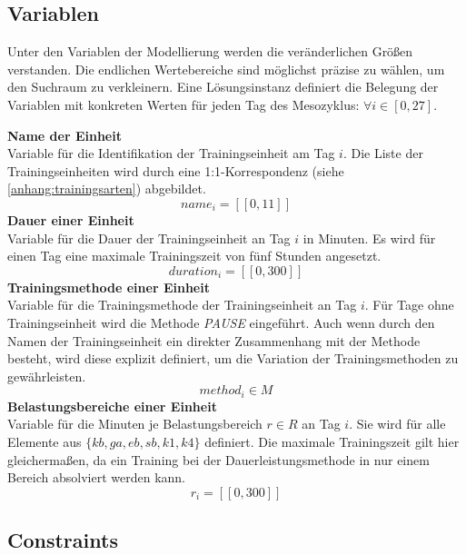 \subsection{Variablen}
Unter den Variablen der Modellierung werden die veränderlichen Größen verstanden. Die endlichen Wertebereiche sind möglichst präzise zu wählen, um den Suchraum zu verkleinern. Eine Lösungsinstanz definiert die Belegung der Variablen mit konkreten Werten für jeden Tag des Mesozyklus:  $\forall i \in [0, 27]$.\par
\textbf{Name der Einheit} \\[0.2em]
Variable für die Identifikation der Trainingseinheit am Tag $i$. Die Liste der Trainingseinheiten wird durch eine 1:1-Korrespondenz (siehe \ref{anhang:trainingsarten}) abgebildet.
\begin{equation}
    name_i = [\![0, 11]\!]
\end{equation}
\textbf{Dauer einer Einheit} \\[0.2em]
Variable für die Dauer der Trainingseinheit an Tag $i$ in Minuten. Es wird für einen Tag eine maximale Trainingszeit von fünf Stunden angesetzt.
\begin{equation} 
    duration_i = [\![0, 300]\!] \end{equation} 
\textbf{Trainingsmethode einer Einheit} \\[0.2em]
Variable für die Trainingsmethode der Trainingseinheit an Tag $i$. Für Tage ohne Trainingseinheit wird die Methode \textit{PAUSE} eingeführt. Auch wenn durch den Namen der Trainingseinheit ein direkter Zusammenhang mit der Methode besteht, wird diese explizit definiert, um die Variation der Trainingsmethoden zu gewährleisten.
\begin{equation}
    method_i \in M
\end{equation} 
\textbf{Belastungsbereiche einer Einheit} \\[0.2em]
Variable für die Minuten je Belastungsbereich $r \in R$ an Tag $i$. Sie wird für alle Elemente aus $\{kb, ga, eb, sb, k1, k4\}$ definiert. Die maximale Trainingszeit gilt hier gleichermaßen, da ein Training bei der Dauerleistungsmethode in nur einem Bereich absolviert werden kann. \newline
\begin{equation} 
    r_i = [\![0, 300]\!]
\end{equation} 
\subsection{Constraints}
